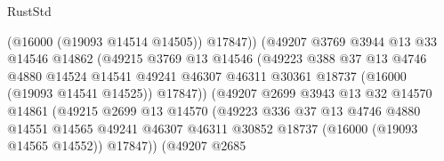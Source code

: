 \begin{lexlean}{RustStd}
\begin{coremodule}
                                      (@16000 (@19093 @14514 @14505))
                                      @17847))
                                  (@49207
                                    @3769
                                    @3944
                                    @13
                                    @33
                                    @14546
                                    @14862
                                    (@49215
                                      @3769
                                      @13
                                      @14546
                                      (@49223
                                        @388
                                        @37
                                        @13
                                        @4746
                                        @4880
                                        @14524
                                        @14541
                                        @49241
                                        @46307
                                        @46311
                                        @30361
                                        @18737
                                        (@16000 (@19093 @14541 @14525))
                                        @17847))
                                    (@49207
                                      @2699
                                      @3943
                                      @13
                                      @32
                                      @14570
                                      @14861
                                      (@49215
                                        @2699
                                        @13
                                        @14570
                                        (@49223
                                          @336
                                          @37
                                          @13
                                          @4746
                                          @4880
                                          @14551
                                          @14565
                                          @49241
                                          @46307
                                          @46311
                                          @30852
                                          @18737
                                          (@16000 (@19093 @14565 @14552))
                                          @17847))
                                      (@49207
                                        @2685

\end{coremodule}
\end{lexlean}

